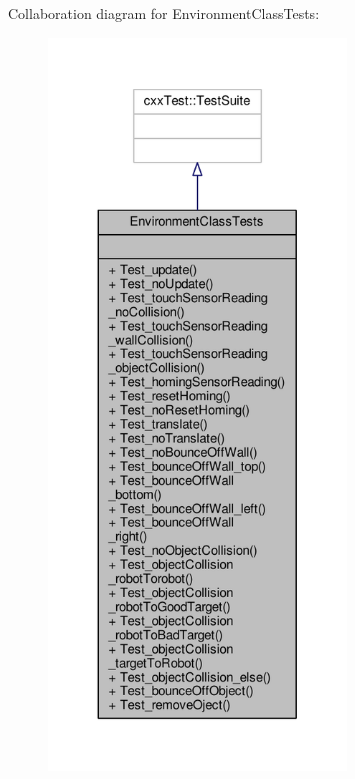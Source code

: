 Collaboration diagram for Environment\-Class\-Tests\-:\nopagebreak
\begin{figure}[H]
\begin{center}
\leavevmode
\includegraphics[height=550pt]{classEnvironmentClassTests__coll__graph}
\end{center}
\end{figure}
